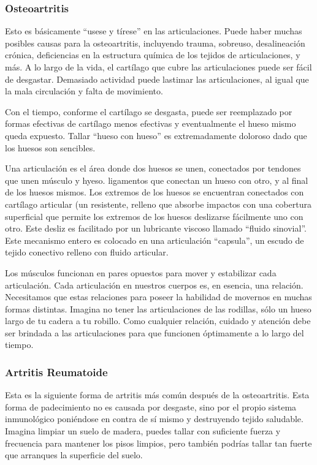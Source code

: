 \subsubsection{Osteoartritis}
Esto es básicamente ``usese y tírese'' en las articulaciones. Puede haber muchas posibles causas para la osteoartritis, incluyendo trauma, sobreuso, desalineación crónica, deficiencias en la estructura química de los tejidos de articulaciones, y más. A lo largo de la vida, el cartílago que cubre las articulaciones puede ser fácil de desgastar. Demasiado actividad puede lastimar las articulaciones, al igual que la mala circulación y falta de movimiento.

Con el tiempo, conforme el cartílago se desgasta, puede ser reemplazado por formas efectivas de cartílago menos efectivas y eventualmente el hueso mismo queda expuesto. Tallar ``hueso con hueso'' es extremadamente doloroso dado que los huesos son sencibles.

Una articulación es el área donde dos huesos se unen, conectados por tendones que unen músculo y hyeso. ligamentos que conectan un hueso con otro, y al final de los huesos mismos. Los extremos de los huesos se encuentran conectados con cartílago articular (un resistente, relleno que absorbe impactos con una cobertura superficial que permite los extremos de los huesos deslizarse fácilmente uno con otro. Este desliz es facilitado por un lubricante viscoso llamado ``fluido sinovial''. Este mecanismo entero es colocado en una articulación ``capsula'', un escudo de tejido conectivo relleno con fluido articular.

Los músculos funcionan en pares opuestos para mover y estabilizar cada articulación. Cada articulación en nuestros cuerpos es, en esencia, una relación. Necesitamos que estas relaciones para poseer la habilidad de movernos en muchas formas distintas. Imagina no tener las articulaciones de las rodillas, sólo un hueso largo de tu cadera a tu robillo. Como cualquier relación, cuidado y atención debe ser brindada a las articulaciones para que funcionen óptimamente a lo largo del tiempo.

\subsubsection{Artritis Reumatoide}
Esta es la siguiente forma de artritis más común despu\'es de la osteoartritis. Esta forma de padecimiento no es causada por desgaste, sino por el propio sistema inmunológico poni\'endose en contra de sí mismo y destruyendo tejido saludable. Imagina limpiar un suelo de madera, puedes tallar con suficiente fuerza y frecuencia para mantener los pisos limpios, pero tambi\'en podrías tallar tan fuerte que arranques la superficie del suelo.

